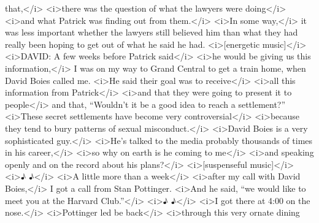\begin{itemize}
\begin{itemize}
    that,\textless{}/i\textgreater{} \textless{}i\textgreater{}there was
    the question of what the lawyers were
    doing\textless{}/i\textgreater{} \textless{}i\textgreater{}and what
    Patrick was finding out from them.\textless{}/i\textgreater{}
    \textless{}i\textgreater{}In some way,\textless{}/i\textgreater{} it
    was less important whether the lawyers still believed him than what
    they had really been hoping to get out of what he said he had.
    \textless{}i\textgreater{}{[}energetic
    music{]}\textless{}/i\textgreater{} \textless{}i\textgreater{}DAVID:
    A few weeks before Patrick said\textless{}/i\textgreater{}
    \textless{}i\textgreater{}he would be giving us this
    information,\textless{}/i\textgreater{} I was on my way to Grand
    Central to get a train home, when David Boies called me.
    \textless{}i\textgreater{}He said their goal was to
    receive\textless{}/i\textgreater{} \textless{}i\textgreater{}all
    this information from Patrick\textless{}/i\textgreater{}
    \textless{}i\textgreater{}and that they were going to present it to
    people\textless{}/i\textgreater{} and that, ``Wouldn't it be a good
    idea to reach a settlement?'' \textless{}i\textgreater{}These secret
    settlements have become very
    controversial\textless{}/i\textgreater{}
    \textless{}i\textgreater{}because they tend to bury patterns of
    sexual misconduct.\textless{}/i\textgreater{}
    \textless{}i\textgreater{}David Boies is a very sophisticated
    guy.\textless{}/i\textgreater{} \textless{}i\textgreater{}He's
    talked to the media probably thousands of times in his
    career,\textless{}/i\textgreater{} \textless{}i\textgreater{}so why
    on earth is he coming to me\textless{}/i\textgreater{}
    \textless{}i\textgreater{}and speaking openly and on the record
    about his plans?\textless{}/i\textgreater{}
    \textless{}i\textgreater{}{[}suspenseful
    music{]}\textless{}/i\textgreater{} \textless{}i\textgreater{}♪
    ♪\textless{}/i\textgreater{} \textless{}i\textgreater{}A little more
    than a week\textless{}/i\textgreater{}
    \textless{}i\textgreater{}after my call with David
    Boies,\textless{}/i\textgreater{} I got a call from Stan Pottinger.
    \textless{}i\textgreater{}And he said, ``we would like to meet you
    at the Harvard Club.''\textless{}/i\textgreater{}
    \textless{}i\textgreater{}♪ ♪\textless{}/i\textgreater{}
    \textless{}i\textgreater{}I got there at 4:00 on the
    nose.\textless{}/i\textgreater{} \textless{}i\textgreater{}Pottinger
    led be back\textless{}/i\textgreater{}
    \textless{}i\textgreater{}through this very ornate dining

\end{itemize}
\end{itemize}
